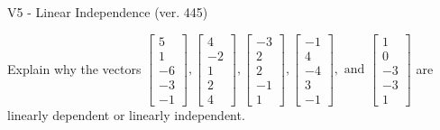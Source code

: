 \begin{exercise}
  \begin{exerciseTitle}V5 - Linear Independence (ver. 445)\end{exerciseTitle}
  \begin{exerciseStatement}
    Explain why the vectors \(\left[\begin{array}{r}
5 \\
1 \\
-6 \\
-3 \\
-1
\end{array}\right] , \left[\begin{array}{r}
4 \\
-2 \\
1 \\
2 \\
4
\end{array}\right] , \left[\begin{array}{r}
-3 \\
2 \\
2 \\
-1 \\
1
\end{array}\right] , \left[\begin{array}{r}
-1 \\
4 \\
-4 \\
3 \\
-1
\end{array}\right] , \text{ and } \left[\begin{array}{r}
1 \\
0 \\
-3 \\
-3 \\
1
\end{array}\right]\) are linearly dependent or linearly independent.	



\end{exerciseStatement}
\end{exercise}
